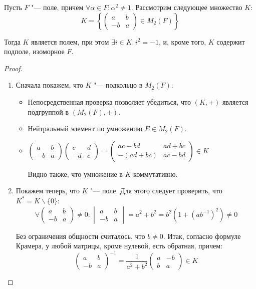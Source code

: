 \begin{theorem}
	Пусть $F$ "--- поле, причем $\forall \alpha \in F: \alpha^2 \ne 1$. Рассмотрим следующее множество $K$:
	\[K = \left\{\begin{pmatrix}
	a & b\\
	-b & a
	\end{pmatrix} \in M_2(F)\right\}\]
	
	Тогда $K$ является полем, при этом $\exists i \in K: i^2 = -1$, и, кроме того, $K$ содержит подполе, изоморное $F$.
\end{theorem}

\begin{proof}~
	\begin{enumerate}
		\item Сначала покажем, что $K$ "--- подкольцо в $M_2(F)$:
		\begin{itemize}
			\item Непосредственная проверка позволяет убедиться, что $(K, +)$ является подгруппой в $(M_2(F), +)$.
			\item Нейтральный элемент по умножению $E \in M_2(F)$.
			\item $\begin{pmatrix}
			a & b\\
			-b & a
			\end{pmatrix}
			\begin{pmatrix}
			c & d\\
			-d & c
			\end{pmatrix} = 
			\begin{pmatrix}
			ac - bd & ad + bc\\
			-(ad+bc) & ac - bd
			\end{pmatrix} \in K$
			
			Видно также, что умножение в $K$ коммутативно.
		\end{itemize}
		
		\item Покажем теперь, что $K$ "--- поле. Для этого следует проверить, что $K^* = K \backslash \{0\}$:
		\[\forall \begin{pmatrix}
		a & b\\
		-b & a
		\end{pmatrix} \ne 0: \begin{vmatrix}
		a & b\\
		-b & a
		\end{vmatrix} = a^{2} + b^{2} = b^2(1 + (ab^{-1})^2) \ne 0\]
		
		Без ограничения общности считалось, что $b \ne 0$. Итак, согласно формуле Крамера, у любой матрицы, кроме нулевой, есть обратная, причем:
		\[\begin{pmatrix}
		a & b\\
		-b & a
		\end{pmatrix}^{-1} = \frac{1}{a^2 + b^2}\begin{pmatrix}
		a & -b\\
		b & a
		\end{pmatrix} \in K\]
		

\end{enumerate}
\end{proof}
